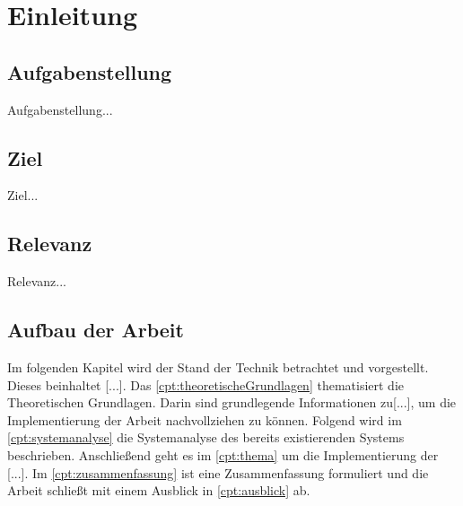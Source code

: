 \chapter{Einleitung}

\section{Aufgabenstellung}

Aufgabenstellung...

\section{Ziel}

Ziel...

\section{Relevanz}

Relevanz...

\section{Aufbau der Arbeit}
Im folgenden Kapitel wird der Stand der Technik betrachtet und vorgestellt. Dieses beinhaltet [...]. Das \autoref{cpt:theoretischeGrundlagen} thematisiert die Theoretischen Grundlagen. Darin sind grundlegende Informationen zu[...], um die Implementierung der Arbeit nachvollziehen zu können. Folgend wird im \autoref{cpt:systemanalyse} die Systemanalyse des bereits existierenden Systems beschrieben. Anschließend geht es im \autoref{cpt:thema} um die Implementierung der [...]. Im \autoref{cpt:zusammenfassung} ist eine Zusammenfassung formuliert und die Arbeit schließt mit einem Ausblick in \autoref{cpt:ausblick} ab.